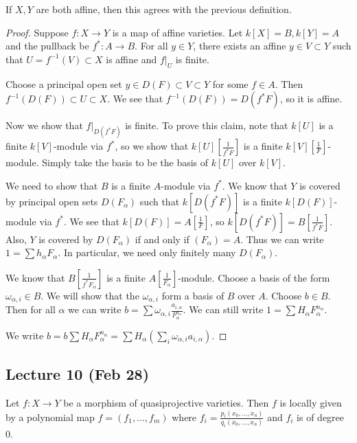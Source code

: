 \documentclass[twoside, 10pt]{article}
\begin{document}
    \begin{prop} If $X, Y$ are both affine, then this agrees with the previous
        definition.  \begin{proof} Suppose $f:X \to Y$ is a map of affine
            varieties. Let $k[X] = B, k[Y] = A$ and the pullback be $f^*:A \to
            B$. For all $y \in Y$, there exists an affine $y \in V \subset Y$
            such that $U = f^{-1}(V) \subset X$ is affine and $f|_U$ is finite.

        Choose a principal open set $y \in D(F) \subset V \subset Y$ for some
        $f \in A$. Then $f^{-1}(D(F)) \subset U \subset X$. We see that
        $f^{-1}(D(F)) = D(f^*F)$, so it is affine.

        Now we show that $f\vert_{D(f^*F)}$ is finite. To prove this claim,
        note that $k[U]$ is a finite $k[V]$-module via $f^*$, so we show that
        $k[U][\frac{1}{f^*F}]$ is a finite $k[V][\frac{1}{F}]$-module. Simply
        take the basis to be the basis of $k[U]$ over $k[V]$.

        We need to show that $B$ is a finite $A$-module via $f^*$. We know that
        $Y$ is covered by principal open sets $D(F_{\alpha})$ such that
        $k[D(f^*F)]$ is a finite $k[D(F)]$-module via $f^*$. We see that
        $k[D(F)] = A[\frac{1}{F}]$, so $k[D(f^*F)] = B[\frac{1}{f^*F}]$. Also,
        $Y$ is covered by $D(F_{\alpha})$ if and only if $(F_{\alpha}) = A$.
        Thus we can write $1 = \sum h_{\alpha}F_{\alpha}$. In particular, we
        need only finitely many $D(F_{\alpha})$.

        We know that $B[\frac{1}{f^*F_{\alpha}}]$ is a finite
        $A[\frac{1}{F_{\alpha}}]$-module. Choose a basis of the form
        $\omega_{\alpha, i} \in B$. We will show that the $\omega_{\alpha, i}$
        form a basis of $B$ over $A$. Choose $b \in B$. Then for all $\alpha$
        we can write $b = \sum \omega_{\alpha, i} \frac{a_{i,
        \alpha}}{F_{\alpha}^{n_{\alpha}}}$. We can still write $1 = \sum
        H_{\alpha}F_{\alpha}^{n_{\alpha}}$.

        We write $b = b \sum H_{\alpha}F_{\alpha}^{n_{\alpha}} = \sum
    H_{\alpha}(\sum_i \omega_{\alpha, i}a_{i,\alpha})$.  \end{proof} \end{prop}
    
    \subsection{Lecture 10 (Feb 28)} Let $f:X \to Y$ be a morphism of
    quasiprojective varieties. Then $f$ is locally given by a polynomial map $f
    = (f_1, \ldots, f_m)$ where $f_i = \frac{p_i(x_0, \ldots, x_n)}{q_i(x_0,
    \ldots, x_n)}$ and $f_i$ is of degree $0$.
\end{document}
